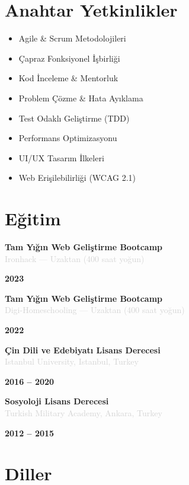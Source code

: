 \documentclass[10pt,a4paper]{article}
\newcommand{\Education}[3]{%
  \vspace{2pt}
  \noindent
  \begin{minipage}[t]{0.70\textwidth}
    {\normalsize\textbf{\color{darkgray}#1}} \\
    \textcolor{lightgray}{\small #2}
  \end{minipage}%
  \hfill
  \begin{minipage}[t]{0.28\textwidth}
    \raggedleft
    \textcolor{mediumgray}{\small\textbf{#3}}
  \end{minipage}
  \vspace{1pt}
}
\begin{document}
\section*{Anahtar Yetkinlikler}

\noindent
\begin{minipage}[t]{0.48\textwidth}
  \begin{itemize}
    \item Agile \& Scrum Metodolojileri
    \item Çapraz Fonksiyonel İşbirliği
    \item Kod İnceleme \& Mentorluk
    \item Problem Çözme \& Hata Ayıklama
  \end{itemize}
\end{minipage}%
\hfill
\begin{minipage}[t]{0.48\textwidth}
  \begin{itemize}
    \item Test Odaklı Geliştirme (TDD)
    \item Performans Optimizasyonu
    \item UI/UX Tasarım İlkeleri
    \item Web Erişilebilirliği (WCAG 2.1)
  \end{itemize}
\end{minipage}

\section*{Eğitim}

\Education{Tam Yığın Web Geliştirme Bootcamp}{Ironhack — Uzaktan (400 saat yoğun)}{2023}

\Education{Tam Yığın Web Geliştirme Bootcamp}{Digi-Homeschooling — Uzaktan (400 saat yoğun)}{2022}

\Education{Çin Dili ve Edebiyatı Lisans Derecesi}{Istanbul University, Istanbul, Turkey}{2016 -- 2020}

\Education{Sosyoloji Lisans Derecesi}{Turkish Military Academy, Ankara, Turkey}{2012 -- 2015}

\section*{Diller}
\end{document}
